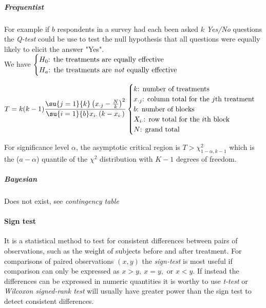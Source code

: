 \subparagraph{Frequentist}
For example if $b$ respondents in a survey had each been asked $k$ \emph{Yes/No} questions
the \emph{Q-test} could be use to test the null hypothesis that all questions were equally
likely to elicit the answer "Yes".\\
We have
$\begin{cases}
    H_{0}\text{: the treatments are equally effective} \\
    H_{a}\text{: the treatments are \emph{not} equally effective} 
\end{cases}$

\begin{center}
    $
    T = k(k-1)\dfrac{\su{j=1}{k}\left(x_{\cdot j} - \frac{N}{k}\right)^{2}}{
    \su{i=1}{b}x_{i\cdot}\left(k-x_{i\cdot}\right)}
    \begin{cases}
        k\text{: number of treatments} \\
        x_{\cdot j}\text{: column total for the }j\text{th treatment} \\
        b\text{: number of blocks} \\
        X_{i\cdot}\text{: row total for the }i\text{th block} \\
        N\text{: grand total}
         
    \end{cases}$
\end{center}

For significance level $\alpha$, the asymptotic critical region is 
$T > \chi^{2}_{1-\alpha, k-1}$ which is the ($a-\alpha$) quantile of the $\chi^{2}$ 
distribution with $K-1$ degrees of freedom.

\subparagraph{Bayesian}
Does not exist, see \emph{contingency table} \\



\paragraph{Sign test}
It is a statistical method to test for consistent differences between pairs of 
observations, such as the weight of subjects before and after treatment.
For comparisons of paired observations $(x, y)$ the \emph{sign-test} is most useful if 
comparison can only be expressed as $x>y,~x=y,\text{ or } x<y$.
If instead the differences can be expressed in numeric quantities it is worthy to use 
\emph{t-test} or \emph{Wilcoxon signed-rank test} will usually have greater power than
the sign test to detect consistent differences.

